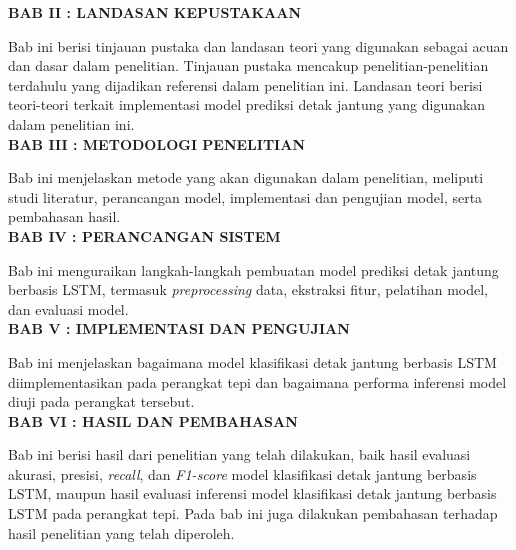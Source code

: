 \noindent
\textbf{BAB II : LANDASAN KEPUSTAKAAN}

Bab ini berisi tinjauan pustaka dan landasan teori yang digunakan sebagai acuan dan dasar dalam penelitian. Tinjauan pustaka mencakup penelitian-penelitian terdahulu yang dijadikan referensi dalam penelitian ini. Landasan teori berisi teori-teori terkait implementasi model prediksi detak jantung yang digunakan dalam penelitian ini.\\

\noindent
\textbf{BAB III : METODOLOGI PENELITIAN}

Bab ini menjelaskan metode yang akan digunakan dalam penelitian, meliputi studi literatur, perancangan model, implementasi dan pengujian model, serta pembahasan hasil.\\

\noindent
\textbf{BAB IV : PERANCANGAN SISTEM}

Bab ini menguraikan langkah-langkah pembuatan model prediksi detak jantung berbasis LSTM, termasuk \textit{preprocessing} data, ekstraksi fitur, pelatihan model, dan evaluasi model.\\

\noindent
\textbf{BAB V : IMPLEMENTASI DAN PENGUJIAN}

Bab ini menjelaskan bagaimana model klasifikasi detak jantung berbasis LSTM diimplementasikan pada perangkat tepi dan bagaimana performa inferensi model diuji pada perangkat tersebut.\\

\noindent
\textbf{BAB VI : HASIL DAN PEMBAHASAN}

Bab ini berisi hasil dari penelitian yang telah dilakukan, baik hasil evaluasi akurasi, presisi, \emph{recall}, dan \emph{F1-score} model klasifikasi detak jantung berbasis LSTM, maupun hasil evaluasi inferensi model klasifikasi detak jantung berbasis LSTM pada perangkat tepi.
Pada bab ini juga dilakukan pembahasan terhadap hasil penelitian yang telah diperoleh.\\

